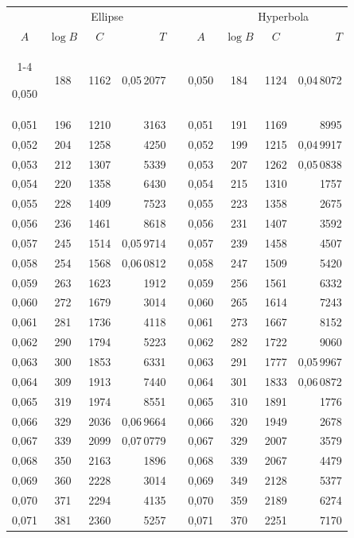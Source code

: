 \begin{tabular}{|c|c|c|r|@{}p{9pt}@{}|c|c|c|r|}
\hline
\rule{0pt}{8.5pt} & \multicolumn{3}{c|}{Ellipse} & & & \multicolumn{3}{c|}{Hyperbola} \\
\(A\) & \(\log B\) & \(C\) & \(T\) & & \(A\) & \(\log B\) & \(C\) & \(T\) \\
\cline{1-4}\cline{6-9}
\rule{0pt}{8.5pt}0,050 & 188 & 1162 & 0,05\,2077 &  & 0,050 & 184 & 1124 & 0,04\,8072 \\
0,051 & 196 & 1210 & 3163 &  & 0,051 & 191 & 1169 & 8995 \\
0,052 & 204 & 1258 & 4250 &  & 0,052 & 199 & 1215 & 0,04\,9917 \\
0,053 & 212 & 1307 & 5339 &  & 0,053 & 207 & 1262 & 0,05\,0838 \\
0,054 & 220 & 1358 & 6430 &  & 0,054 & 215 & 1310 & 1757 \\
0,055 & 228 & 1409 & 7523 &  & 0,055 & 223 & 1358 & 2675 \\[3pt]
0,056 & 236 & 1461 & 8618 &  & 0,056 & 231 & 1407 & 3592 \\
0,057 & 245 & 1514 & 0,05\,9714 &  & 0,057 & 239 & 1458 & 4507 \\
0,058 & 254 & 1568 & 0,06\,0812 &  & 0,058 & 247 & 1509 & 5420 \\
0,059 & 263 & 1623 & 1912 &  & 0,059 & 256 & 1561 & 6332 \\
0,060 & 272 & 1679 & 3014 &  & 0,060 & 265 & 1614 & 7243 \\[3pt]
0,061 & 281 & 1736 & 4118 &  & 0,061 & 273 & 1667 & 8152 \\
0,062 & 290 & 1794 & 5223 &  & 0,062 & 282 & 1722 & 9060 \\
0,063 & 300 & 1853 & 6331 &  & 0,063 & 291 & 1777 & 0,05\,9967 \\
0,064 & 309 & 1913 & 7440 &  & 0,064 & 301 & 1833 & 0,06\,0872 \\
0,065 & 319 & 1974 & 8551 &  & 0,065 & 310 & 1891 & 1776 \\[3pt]
0,066 & 329 & 2036 & 0,06\,9664 &  & 0,066 & 320 & 1949 & 2678 \\
0,067 & 339 & 2099 & 0,07\,0779 &  & 0,067 & 329 & 2007 & 3579 \\
0,068 & 350 & 2163 & 1896 &  & 0,068 & 339 & 2067 & 4479 \\
0,069 & 360 & 2228 & 3014 &  & 0,069 & 349 & 2128 & 5377 \\
0,070 & 371 & 2294 & 4135 &  & 0,070 & 359 & 2189 & 6274 \\[3pt]
0,071 & 381 & 2360 & 5257 &  & 0,071 & 370 & 2251 & 7170 \\

\end{tabular}
